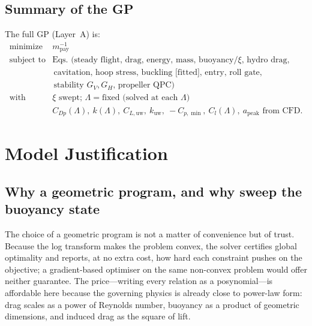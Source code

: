 \documentclass[conf]{new-aiaa}
\begin{document}
\subsection{Summary of the GP}
The full GP (Layer~A) is:
\begin{equation}\label{eq:gpsummary}
\begin{array}{ll}
\text{minimize}    & m_{\text{pay}}^{-1} \\
\text{subject to} & \text{Eqs. (steady flight, drag, energy, mass, buoyancy/$\xi$, hydro drag,} \\
                  & \hspace{2pt}\text{cavitation, hoop stress, buckling [fitted], entry, roll gate,} \\
	                  & \hspace{2pt}\text{stability $G_V,G_H$, propeller QPC)} \\
\text{with}        & \text{$\xi$ swept; $\Lambda=\text{fixed}$ (solved at each $\Lambda$)} \\
                  & C_{Dp}(\Lambda),\ k(\Lambda),\ C_{L,\text{uw}},\ k_{\text{uw}},\ -C_{p,\min},\ C_l(\Lambda),\ a_{\text{peak}} \text{ from CFD}.
\end{array}
\end{equation}

\section{Model Justification}\label{sec:justify}

\subsection{Why a geometric program, and why sweep the buoyancy state}
The choice of a geometric program is not a matter of convenience but of trust. Because the log
transform makes the problem convex, the solver certifies global optimality and reports, at no extra
cost, how hard each constraint pushes on the objective; a gradient-based optimiser on the same
non-convex problem would offer neither guarantee. The price---writing every relation as a
posynomial---is affordable here because the governing physics is already close to power-law form:
drag scales as a power of Reynolds number, buoyancy as a product of geometric dimensions, and induced
drag as the square of lift.
\end{document}
